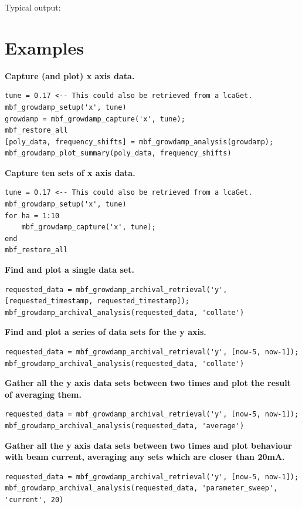\documentclass{report}
\begin{document}
Typical output:


\section{Examples}

\textbf{Capture (and plot) x axis data.}
\begin{verbatim}
tune = 0.17 <-- This could also be retrieved from a lcaGet.
mbf_growdamp_setup('x', tune)
growdamp = mbf_growdamp_capture('x', tune);
mbf_restore_all
[poly_data, frequency_shifts] = mbf_growdamp_analysis(growdamp);
mbf_growdamp_plot_summary(poly_data, frequency_shifts)
\end{verbatim}
\textbf{Capture ten sets of x axis data.}
\begin{verbatim}
tune = 0.17 <-- This could also be retrieved from a lcaGet.
mbf_growdamp_setup('x', tune)
for ha = 1:10
    mbf_growdamp_capture('x', tune);
end
mbf_restore_all
\end{verbatim}

\textbf{Find and plot a single data set.}
\begin{verbatim}
requested_data = mbf_growdamp_archival_retrieval('y', [requested_timestamp, requested_timestamp]);
mbf_growdamp_archival_analysis(requested_data, 'collate')
\end{verbatim}

\textbf{Find and plot a series of data sets for the y axis.}
\begin{verbatim}
requested_data = mbf_growdamp_archival_retrieval('y', [now-5, now-1]);
mbf_growdamp_archival_analysis(requested_data, 'collate')
\end{verbatim}

\textbf{Gather all the y axis data sets between two times and plot the result of averaging them.}
\begin{verbatim}
requested_data = mbf_growdamp_archival_retrieval('y', [now-5, now-1]);
mbf_growdamp_archival_analysis(requested_data, 'average')
\end{verbatim}

\textbf{Gather all the y axis data sets between two times and plot behaviour with beam current, averaging any sets which are closer than 20mA.}
\begin{verbatim}
requested_data = mbf_growdamp_archival_retrieval('y', [now-5, now-1]);
mbf_growdamp_archival_analysis(requested_data, 'parameter_sweep', 'current', 20)
\end{verbatim}
\end{document}

